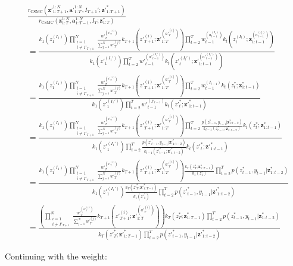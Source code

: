 \documentclass[11pt]{article}
\newcommand{\z}{\mathbf{z}}
\newcommand{\abold}{\mathbf{a}}
\begin{document}
\begin{align*}
& \frac{r_{\mathrm{CSMC}}({\z'}_{1:T+1}^{1:N}, {\abold'}_{1:T}^{1:N}, I_{T+1}'; {\z'}_{1:T+1}^*)}
{r_{\mathrm{CSMC}}(\z_{1:T}^{1:N}, \abold_{1:T-1}^{1:N}, I_T; \z_{1:T}^*)}\\
&= 
\frac{
k_1(z_1^{(I_1)}) \displaystyle \prod_{\substack{i=1\\i \ne I'_{T+1}}}^N \frac{{w'}_{T}^{({a'}_{T}^{(i)})}}{\sum_{j=1}^N {w'}_{T}^{(j)}} k_{T+1}({z'}_{T+1}^{(i)}; {\z'}_{1:T}^{({a'}_{T}^{(i)})} )
\prod_{t=2}^{T} {w}_{t-1}^{({a}_{t-1}^{(I_t)})} k_t({z}_t^{(I_t)}; {\z}_{1:t-1}^{({a}_{t-1}^{(I_t)})} )
}{
k_1({z'}_1^{(I_1')}) \displaystyle \prod_{t=2}^{T} {w'}_{t-1}^{({a'}_{t-1}^{(I_t')})} k_t({z'}_t^{(I_t')}; {\z'}_{1:t-1}^{({a'}_{t-1}^{(I_t')})} )
}\\
&=
\frac{
k_1(z_1^{(I_1)}) \displaystyle \prod_{\substack{i=1\\i \ne I'_{T+1}}}^N \frac{{w'}_{T}^{({a'}_{T}^{(i)})}}{\sum_{j=1}^N {w'}_{T}^{(j)}} k_{T+1}({z'}_{T+1}^{(i)}; {\z'}_{1:T}^{({a'}_{T}^{(i)})} )
\prod_{t=2}^{T} {w}_{t-1}^{(I_{t-1})} k_t({z}_t^*; {\z}_{1:t-1}^{*} )
}{
k_1({z'}_1^{(I_1')}) \displaystyle \prod_{t=2}^{T} {w'}_{t-1}^{(I'_{t-1})} k_t({z'}_t^{*}; {\z'}_{1:t-1}^{*} )
}\\
&=
\frac{
k_1(z_1^{(I_1)}) \displaystyle \prod_{\substack{i=1\\i \ne I'_{T+1}}}^N \frac{{w'}_{T}^{({a'}_{T}^{(i)})}}{\sum_{j=1}^N {w'}_{T}^{(j)}} k_{T+1}({z'}_{T+1}^{(i)}; {\z'}_{1:T}^{({a'}_{T}^{(i)})} )
\prod_{t=2}^{T} \frac{p(z_{t-1}^*, y_{t-1} | {\z}_{1:t-2}^{*})}{k_{t-1}(z_{t-1}^{*}; \z_{1:t-2}^{*})} k_t({z}_t^*; {\z}_{1:t-1}^{*} )
}{
k_1({z'}_1^{(I_1')}) \displaystyle \prod_{t=2}^{T} \frac{p({z'}_{t-1}^*, y_{t-1} | {\z'}_{1:t-2}^*)}{k_{t-1}({z'}_{t-1}^*; {\z'}_{1:t-2}^{*})} k_t({z'}_t^{*}; {\z'}_{1:t-1}^{*} )
}\\
&=
\frac{
k_1(z_1^{(I_1)}) \displaystyle \prod_{\substack{i=1\\i \ne I'_{T+1}}}^N \frac{{w'}_{T}^{({a'}_{T}^{(i)})}}{\sum_{j=1}^N {w'}_{T}^{(j)}} k_{T+1}({z'}_{T+1}^{(i)}; {\z'}_{1:T}^{({a'}_{T}^{(i)})} )
\frac{k_T(z_T^*; \z_{1:T-1}^*)}{k_1(z_1^*)} \prod_{t=2}^{T} p(z_{t-1}^*, y_{t-1} | {\z}_{1:t-2}^{*})
}{
k_1({z'}_1^{(I_1')}) \displaystyle \frac{k_T({z'}_T^*; {\z'}_{1:T-1}^*)}{k_1({z'}_1^*)} \prod_{t=2}^{T} p({z'}_{t-1}^*, y_{t-1} | {\z'}_{1:t-2}^*)
}\\
&=
\frac{
\left( \displaystyle \prod_{\substack{i=1\\i \ne I'_{T+1}}}^N \frac{{w'}_{T}^{({a'}_{T}^{(i)})}}{\sum_{j=1}^N {w'}_{T}^{(j)}} k_{T+1}({z'}_{T+1}^{(i)}; {\z'}_{1:T}^{({a'}_{T}^{(i)})} ) \right)
k_T(z_T^*; \z_{1:T-1}^*)
\displaystyle \prod_{t=2}^{T} p(z_{t-1}^*, y_{t-1} | {\z}_{1:t-2}^{*})
}{
\displaystyle k_T({z'}_T^*; {\z'}_{1:T-1}^*) \prod_{t=2}^{T} p({z'}_{t-1}^*, y_{t-1} | {\z'}_{1:t-2}^*)
}
\end{align*}

Continuing with the weight:

 
\end{document}
